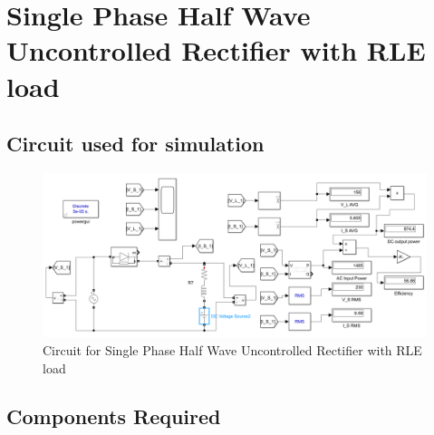 \section{Single Phase Half Wave Uncontrolled Rectifier with RLE load}

\subsection{Circuit used for simulation}

\begin{figure}[h]
    \centering
    \includegraphics[width=1.0\textwidth]{images/experiment-1/circuit-diagram-experiment-04.png}
    \caption{Circuit for Single Phase Half Wave Uncontrolled Rectifier with RLE load}
    \label{Fig_simulation_circuit_single-phase-half-wave-uncontrolled-rectifier-with-RLE-load}
\end{figure}

\subsection{Components Required}

